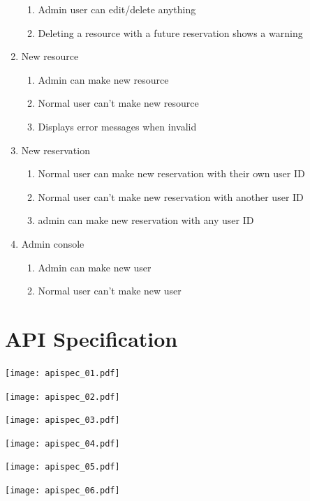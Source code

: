\documentclass[12pt]{article}
\begin{document}
\begin{enumerate}
\begin{enumerate}
        \item Admin user can edit/delete anything
        \item Deleting a resource with a future reservation shows a warning
    \end{enumerate}
    \item New resource
    \begin{enumerate}
        \item Admin can make new resource
        \item Normal user can't make new resource
        \item Displays error messages when invalid
    \end{enumerate}
    \item New reservation
    \begin{enumerate}
        \item Normal user can make new reservation with their own user ID
        \item Normal user can't make new reservation with another user ID
        \item admin can make new reservation with any user ID
    \end{enumerate}
    \item Admin console
    \begin{enumerate}
        \item Admin can make new user
        \item Normal user can't make new user
    \end{enumerate}
\end{enumerate}

\clearpage
\section{API Specification}
\label{appendix:apispec}
\texttt{[image: apispec\_01.pdf]}

\texttt{[image: apispec\_02.pdf]}

\texttt{[image: apispec\_03.pdf]}

\texttt{[image: apispec\_04.pdf]}

\texttt{[image: apispec\_05.pdf]}

\texttt{[image: apispec\_06.pdf]}

\clearpage
\end{document}
